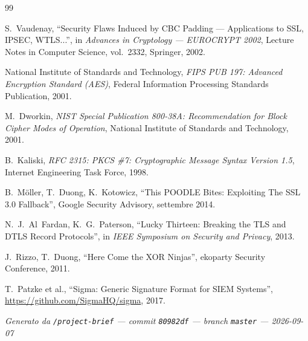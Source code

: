 \documentclass[12pt,a4paper]{article}
\begin{document}
\begin{thebibliography}{99}

  S.~Vaudenay,
  ``Security Flaws Induced by CBC Padding — Applications to SSL, IPSEC, WTLS...'',
  in \textit{Advances in Cryptology — EUROCRYPT 2002},
  Lecture Notes in Computer Science, vol.~2332, Springer, 2002.

  National Institute of Standards and Technology,
  \textit{FIPS PUB 197: Advanced Encryption Standard (AES)},
  Federal Information Processing Standards Publication, 2001.

  M.~Dworkin,
  \textit{NIST Special Publication 800-38A: Recommendation for Block Cipher Modes of Operation},
  National Institute of Standards and Technology, 2001.

  B.~Kaliski,
  \textit{RFC 2315: PKCS \#7: Cryptographic Message Syntax Version 1.5},
  Internet Engineering Task Force, 1998.

  B.~Möller, T.~Duong, K.~Kotowicz,
  ``This POODLE Bites: Exploiting The SSL 3.0 Fallback'',
  Google Security Advisory, settembre 2014.

  N.~J.~Al~Fardan, K.~G.~Paterson,
  ``Lucky Thirteen: Breaking the TLS and DTLS Record Protocols'',
  in \textit{IEEE Symposium on Security and Privacy}, 2013.

  J.~Rizzo, T.~Duong,
  ``Here Come the XOR Ninjas'',
  ekoparty Security Conference, 2011.

  T.~Patzke et al.,
  ``Sigma: Generic Signature Format for SIEM Systems'',
  \url{https://github.com/SigmaHQ/sigma}, 2017.

\end{thebibliography}

\vfill
\begin{center}
\small\textit{Generato da \texttt{/project-brief} — commit \texttt{80982df} — branch \texttt{master} — 2026-09-07}
\end{center}
\end{document}
